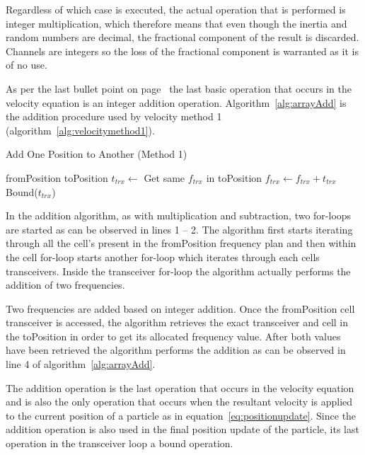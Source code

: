 Regardless of which case is executed, the actual operation that is performed is integer multiplication, which therefore means that even though the inertia and random numbers are decimal, the fractional component of the result is discarded. Channels are integers so the loss of the fractional component is warranted as it is of no use.

As per the last bullet point on page~\pageref{lst:velocitybreakup} the last basic operation that occurs in the velocity equation is an integer addition operation. Algorithm~\ref{alg:arrayAdd} is the addition procedure used by velocity method 1 (algorithm~\ref{alg:velocitymethod1}).
\begin{algorithm}[H]
\caption{Add One Position to Another (Method 1)}
\label{alg:arrayAdd}
\begin{algorithmic}[1]
	\Require fromPosition
	\Require toPosition
			\State $t_{trx} \leftarrow$ Get same $f_{trx}$ in toPosition
			\State $f_{trx} \leftarrow f_{trx} + t_{trx}$
			\State Bound($t_{trx}$)
		\EndFor
	\EndFor
\end{algorithmic}
\end{algorithm}

In the addition algorithm, as with multiplication and subtraction, two for-loops are started as can be observed in lines 1 -- 2. The algorithm first starts iterating through all the cell's present in the fromPosition frequency plan and then within the cell for-loop starts another for-loop which iterates through each cells transceivers. Inside the transceiver for-loop the algorithm actually performs the addition of two frequencies.

Two frequencies are added based on integer addition. Once the fromPosition cell transceiver is accessed, the algorithm retrieves the exact transceiver and cell in the toPosition in order to get its allocated frequency value. After both values have been retrieved the algorithm performs the addition as can be observed in line 4 of algorithm~\ref{alg:arrayAdd}.

The addition operation is the last operation that occurs in the velocity equation and is also the only operation that occurs when the resultant velocity is applied to the current position of a particle as in equation~\ref{eq:positionupdate}. Since the addition operation is also used in the final position update of the particle, its last operation in the transceiver loop a bound operation. 

